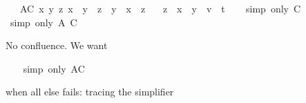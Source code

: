 \begin{isabellebody}
\ \ \ AC{\isacharcolon}{\kern0pt}\ {\isachardoublequoteopen}{\isasymAnd}x\ y\ z{\isachardot}{\kern0pt}\ x\ {\isasymodot}\ {\isacharparenleft}{\kern0pt}y\ {\isasymodot}\ z{\isacharparenright}{\kern0pt}\ {\isacharequal}{\kern0pt}\ y\ {\isasymodot}\ {\isacharparenleft}{\kern0pt}x\ {\isasymodot}\ z{\isacharparenright}{\kern0pt}{\isachardoublequoteclose}\isanewline
\ \ \ {\isachardoublequoteopen}{\isacharparenleft}{\kern0pt}z\ {\isasymodot}\ x{\isacharparenright}{\kern0pt}\ {\isasymodot}\ {\isacharparenleft}{\kern0pt}y\ {\isasymodot}\ v{\isacharparenright}{\kern0pt}\ {\isacharequal}{\kern0pt}\ t{\isachardoublequoteclose}\isanewline
%
\isadelimproof
\ \ %
\endisadelimproof
%
\isatagproof
{}\isamarkupfalse%
\ {\isacharparenleft}{\kern0pt}simp\ only{\isacharcolon}{\kern0pt}\ C{\isacharparenright}{\kern0pt}\isanewline
\ \ \isamarkupfalse%
\ {\isacharparenleft}{\kern0pt}simp\ only{\isacharcolon}{\kern0pt}\ A\ C{\isacharparenright}{\kern0pt}%
\begin{isamarkuptext}%
No confluence. We want %
\end{isamarkuptext}\isamarkuptrue%
\ \ \isamarkupfalse%
\ {\isacharparenleft}{\kern0pt}simp\ only{\isacharcolon}{\kern0pt}\ AC{\isacharparenright}{\kern0pt}\isanewline
\ \ \isamarkupfalse%
%
\endisatagproof
{\isafoldproof}%
%
\isadelimproof
%
\endisadelimproof
%
\begin{isamarkuptext}%
when all else fails: tracing the simplifier


\end{isamarkuptext}
\end{isabellebody}
